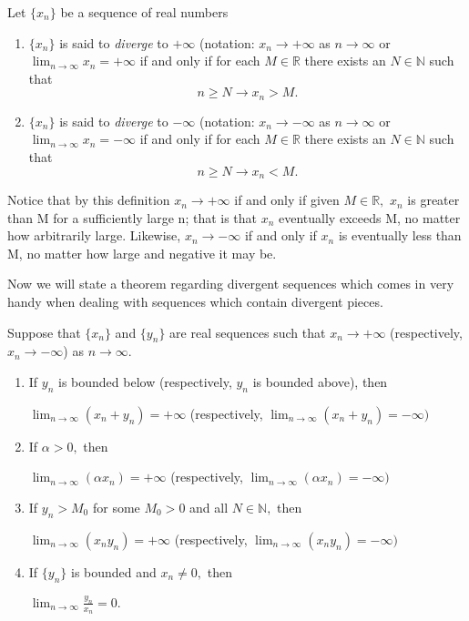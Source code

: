\begin{definition}
Let $\{x_n\}$ be a sequence of real numbers
\begin{enumerate}
\item $\{x_n\}$ is said to \emph{diverge} to $+\infty$ (notation: $x_n \to +\infty$ as $n \to \infty$ or $\lim_{n \to \infty} x_n = +\infty$ if and only if for each $M \in \mathbb{R}$ there exists an $N \in \mathbb{N}$ such that $$n \geq N \rightarrow x_n > M.$$
\item $\{x_n\}$ is said to \emph{diverge} to $-\infty$ (notation: $x_n \to -\infty$ as $n \to \infty$ or $\lim_{n \to \infty} x_n = -\infty$ if and only if for each $M \in \mathbb{R}$ there exists an $N \in \mathbb{N}$ such that $$n \geq N \rightarrow x_n < M.$$
\end{enumerate}
\end{definition}

Notice that by this definition $x_n \to +\infty$ if and only if given $M \in \mathbb{R},$ $x_n$ is greater than M for a sufficiently large n; that is that $x_n$ eventually exceeds M, no matter how arbitrarily large. Likewise, $x_n \to -\infty$ if and only if $x_n$ is eventually less than M, no matter how large and negative it may be.\newline

Now we will state a theorem regarding divergent sequences which comes in very handy when dealing with sequences which contain divergent pieces.

\begin{theorem}
Suppose that $\{x_n\}$ and $\{y_n\}$ are real sequences such that $x_n \to +\infty$ (respectively, $x_n \to -\infty$) as $n \to \infty.$
\begin{enumerate}
\item If $y_n$ is bounded below (respectively, $y_n$ is bounded above), then 
\begin{center}
$\lim_{n \to \infty} (x_n + y_n) = +\infty$ (respectively, $\lim_{n \to \infty}(x_n +y_n) = -\infty)$
\end{center}
\item If $\alpha > 0,$ then
\begin{center}
$\lim_{n \to \infty}(\alpha x_n) = + \infty$ (respectively, $\lim_{n \to \infty}(\alpha x_n) = -\infty)$
\end{center}
\item If $y_n > M_0$ for some $M_0 > 0$ and all $N \in \mathbb{N},$ then
\begin{center}
$\lim_{n \to \infty}(x_n y_n) = +\infty$ (respectively, $\lim_{n \to \infty} (x_n y_n) = -\infty)$
\end{center}
\item If $\{y_n\}$ is bounded and $x_n \neq 0,$ then
\begin{center}
$\lim_{n \to \infty}\frac{y_n}{x_n} = 0.$
\end{center}
\end{enumerate}
\end{theorem}

